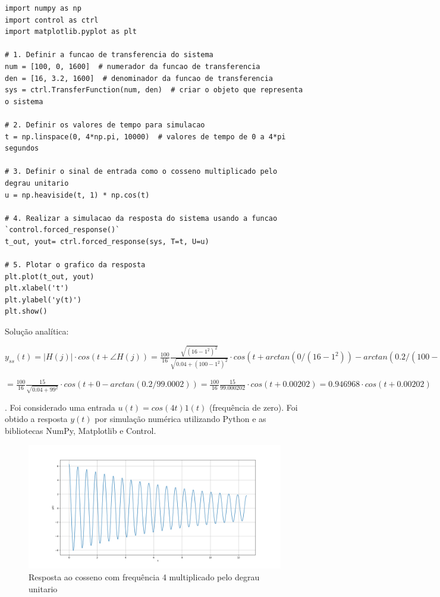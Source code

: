 \documentclass[10pt]{article}
\begin{document}
\begin{lstlisting}
import numpy as np
import control as ctrl
import matplotlib.pyplot as plt

# 1. Definir a funcao de transferencia do sistema
num = [100, 0, 1600]  # numerador da funcao de transferencia
den = [16, 3.2, 1600]  # denominador da funcao de transferencia
sys = ctrl.TransferFunction(num, den)  # criar o objeto que representa o sistema

# 2. Definir os valores de tempo para simulacao
t = np.linspace(0, 4*np.pi, 10000)  # valores de tempo de 0 a 4*pi segundos

# 3. Definir o sinal de entrada como o cosseno multiplicado pelo degrau unitario
u = np.heaviside(t, 1) * np.cos(t)

# 4. Realizar a simulacao da resposta do sistema usando a funcao `control.forced_response()`
t_out, yout= ctrl.forced_response(sys, T=t, U=u)

# 5. Plotar o grafico da resposta
plt.plot(t_out, yout)
plt.xlabel('t')
plt.ylabel('y(t)')
plt.show()
\end{lstlisting}

\quad Solução analítica:

$y_{ss}(t) = |H(j)| \cdot cos(t + \angle H(j)) = \frac{100}{16} \frac{\sqrt{(16-1^2)^2}}{\sqrt{0.04 + (100 - 1^2)^2}} \cdot cos(t + arctan(0/(16 - 1^2)) - arctan(0.2/(100 - 1^2))) =$

$= \frac{100}{16} \frac{15}{\sqrt{0.04 + 99^2}} \cdot cos(t + 0 - arctan(0.2/99.0002)) = \frac{100}{16} \frac{15}{99.000202} \cdot cos(t + 0.00202) = 0.946968 \cdot cos(t + 0.00202)$

\newpage

. Foi considerado uma entrada $u(t) = cos(4 t) 1(t)$ (frequência de zero). Foi obtido a resposta $y(t)$ por simulação numérica utilizando Python
e as bibliotecas NumPy, Matplotlib e Control.

\begin{figure}[h]
    \centering
    \includegraphics[scale=0.45]{questao2.png}
    \caption{Resposta ao cosseno com frequência 4 multiplicado pelo degrau unitario}
\end{figure}
\end{document}
